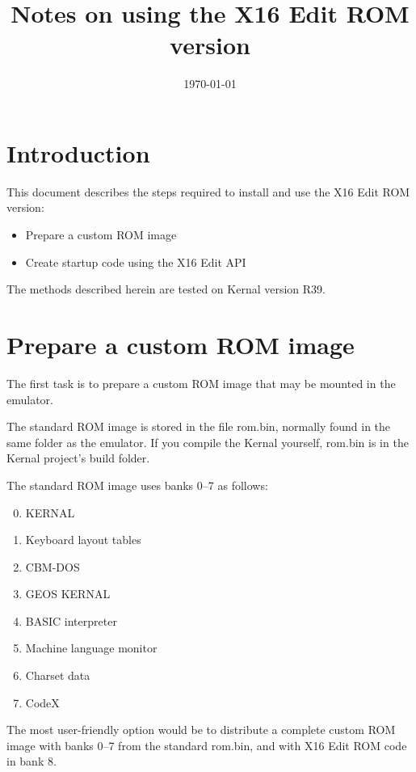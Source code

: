 \documentclass{article}
\title{Notes on using the X16 Edit ROM version}
\date{\today}
\begin{document}
\maketitle

\section{Introduction}

    This document describes the steps required to install and use the X16 Edit ROM version:

    \begin{itemize}
        \item Prepare a custom ROM image
        \item Create startup code using the X16 Edit API
    \end{itemize}

    \noindent The methods described herein are tested on Kernal version R39.

\section{Prepare a custom ROM image}

    The first task is to prepare a custom ROM image that may be mounted in the emulator.

    The standard ROM image is stored in the file rom.bin, normally found in the same folder as the emulator. If you compile the Kernal yourself,
    rom.bin is in the Kernal project's build folder.

    The standard ROM image uses banks 0--7 as follows:

    \begin{enumerate}
        \setcounter{enumi}{-1}
        \item KERNAL
        \item Keyboard layout tables
        \item CBM-DOS
        \item GEOS KERNAL
        \item BASIC interpreter
        \item Machine language monitor
        \item Charset data
        \item CodeX
    \end{enumerate}

    \noindent The most user-friendly option would be to distribute a complete custom ROM image with
    banks 0--7 from the standard rom.bin, and with X16 Edit ROM code in bank 8.
\end{document}
